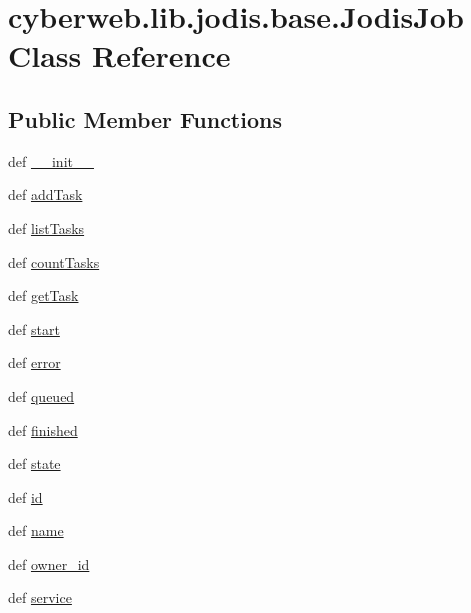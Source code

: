 \hypertarget{classcyberweb_1_1lib_1_1jodis_1_1base_1_1_jodis_job}{\section{cyberweb.\-lib.\-jodis.\-base.\-Jodis\-Job \-Class \-Reference}
\label{classcyberweb_1_1lib_1_1jodis_1_1base_1_1_jodis_job}
}
\subsection*{\-Public \-Member \-Functions}
\begin{DoxyCompactItemize}
\item 
def \hyperlink{classcyberweb_1_1lib_1_1jodis_1_1base_1_1_jodis_job_ae9f60c5bee042ba78f8a0304c593c0c1}{\-\_\-\-\_\-init\-\_\-\-\_\-}
\item 
def \hyperlink{classcyberweb_1_1lib_1_1jodis_1_1base_1_1_jodis_job_ab06f66438b35367f97e1023e609e6c9b}{add\-Task}
\item 
def \hyperlink{classcyberweb_1_1lib_1_1jodis_1_1base_1_1_jodis_job_aacb1bc9e22235f3b37be77e25542aea1}{list\-Tasks}
\item 
def \hyperlink{classcyberweb_1_1lib_1_1jodis_1_1base_1_1_jodis_job_ab434ed08ee3adb6feb72ab1a568ab260}{count\-Tasks}
\item 
def \hyperlink{classcyberweb_1_1lib_1_1jodis_1_1base_1_1_jodis_job_aa913f7114de1f626fbfb9d3e9df97696}{get\-Task}
\item 
def \hyperlink{classcyberweb_1_1lib_1_1jodis_1_1base_1_1_jodis_job_a227daad7ce304e89a7fcb10f4fd98f39}{start}
\item 
def \hyperlink{classcyberweb_1_1lib_1_1jodis_1_1base_1_1_jodis_job_af3d6c107a518d37df8c7bf5dead6cd50}{error}
\item 
def \hyperlink{classcyberweb_1_1lib_1_1jodis_1_1base_1_1_jodis_job_a33d9f7f9563ffbb59274da91d4883d47}{queued}
\item 
def \hyperlink{classcyberweb_1_1lib_1_1jodis_1_1base_1_1_jodis_job_ab33ae8ddb3d5722fcc394955a8cdd5ed}{finished}
\item 
def \hyperlink{classcyberweb_1_1lib_1_1jodis_1_1base_1_1_jodis_job_a29c74f228456e0bfc23a8154ae25c621}{state}
\item 
def \hyperlink{classcyberweb_1_1lib_1_1jodis_1_1base_1_1_jodis_job_a916a38aa8c389b6459419e3a912825a5}{id}
\item 
def \hyperlink{classcyberweb_1_1lib_1_1jodis_1_1base_1_1_jodis_job_ab3522fd5cc5ea768a71ea4ff96644c0e}{name}
\item 
def \hyperlink{classcyberweb_1_1lib_1_1jodis_1_1base_1_1_jodis_job_a7bcee0dd604c3fe4119912d8ca78a1b6}{owner\-\_\-id}
\item 
def \hyperlink{classcyberweb_1_1lib_1_1jodis_1_1base_1_1_jodis_job_adb45e0a8b71eaf0c798bebd63b2b82bf}{service}
\end{DoxyCompactItemize}

